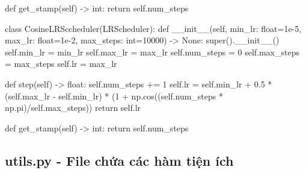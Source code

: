 \documentclass[14pt, a4paper]{article}
\theoremstyle{sltheorem}
\theoremstyle{soltheorem}
\begin{document}
\begin{python}
    
    def get_stamp(self) -> int:
        return self.num_steps
    
    
class CosineLRSccheduler(LRScheduler):
    def __init__(self, min_lr: float=1e-5, max_lr: float=1e-2, max_steps: int=10000) -> None:
        super().__init__()
        self.min_lr = min_lr
        self.max_lr = max_lr
        self.num_steps = 0
        self.max_steps = max_steps
        self.lr = max_lr
        
    def step(self) -> float:
        self.num_steps += 1
        self.lr = self.min_lr + 0.5 * (self.max_lr - self.min_lr) * (1 + np.cos((self.num_steps * np.pi)/self.max_steps))
        return self.lr
    
    
    def get_stamp(self) -> int:
        return self.num_steps
\end{python}

\subsection{utils.py - File chứa các hàm tiện ích}
\end{document}
